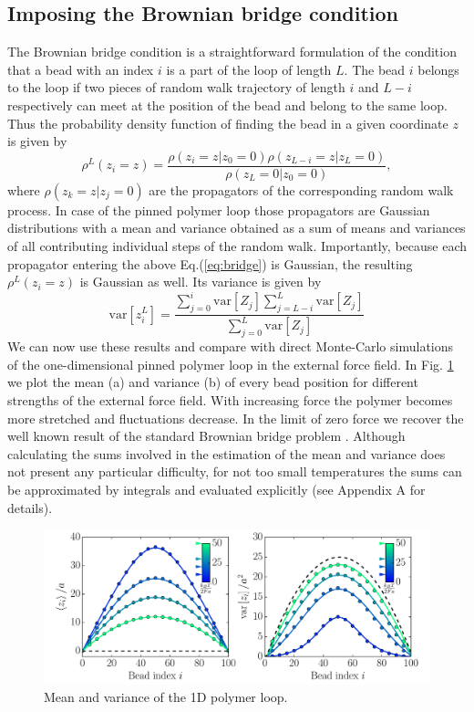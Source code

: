 \documentclass[aps,showpacs,twocolumn,floatfix,prx,superscriptaddress]{revtex4-1}
\begin{document}
\subsection{Imposing the Brownian bridge condition}
The Brownian bridge condition is a straightforward formulation of the condition that a bead with an index $i$ is a part of the loop of length $L$. The bead $i$ belongs to the loop if two pieces of random walk trajectory of length $i$ and $L-i$ respectively can meet at the position of the bead and belong to the same loop. Thus the probability density function of finding the bead in a given coordinate $z$ is given by
\begin{equation}
    \label{eq:bridge}
    \rho^L\left(z_i = z\right) = \frac{\rho\left(z_i = z \vert z_0 = 0\right)
        \rho\left(z_{L-i} = z \vert z_L = 0\right)}{\rho\left(z_L = 0 \vert z_0
            = 0\right)},
\end{equation}
where $ \rho\left(z_k = z \vert z_j = 0\right)$ are the propagators of the corresponding random walk process. In case of the pinned polymer loop those propagators are Gaussian distributions with a mean and variance obtained as a sum of means and variances of all contributing individual steps of the random walk. Importantly, because each propagator entering the above Eq.(\ref{eq:bridge}) is Gaussian, the resulting $\rho^L\left(z_i = z\right)$ is Gaussian as well. Its variance is given by
\begin{equation}
    \label{eq:bridgeVar}
    \text{var}\left[z_i^L\right] =
    \frac{\sum_{j=0}^i\text{var}\left[Z_j\right]\sum_{j=L-i}^L\text{var}\left[Z_j\right]}{\sum_{j=0}^L\text{var}\left[Z_j\right]}
\end{equation}
We can now use these results and compare with direct Monte-Carlo simulations of the one-dimensional pinned polymer loop in the external force field. In Fig.  \ref{fig:meanVar} we plot the mean (a) and variance (b) of every bead position for different strengths of the external force field. With increasing force the polymer becomes more stretched and fluctuations decrease. In the limit of zero force we recover the well known result of the standard Brownian bridge problem \cite{Feller2008}. Although calculating the sums involved in the estimation of the mean and variance does not present any particular difficulty, for not too small temperatures the sums can be approximated by integrals and evaluated explicitly (see Appendix A for details). 
\begin{figure}[htpb]
    \centering
    \includegraphics[width=1.0\linewidth]{meanVar}
    \caption{Mean and variance of the 1D polymer loop.}
    \label{fig:meanVar}
\end{figure}
\end{document}
